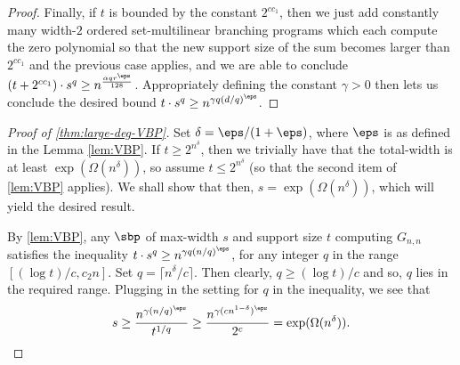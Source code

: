 \documentclass{article}
\begin{document}
\begin{proof}
Finally, if $t$ is bounded by the constant $2^{cc_1}$, then we just add constantly many width-$2$ ordered set-multilinear branching programs which each compute the zero polynomial so that the new support size of the sum becomes larger than $2^{cc_1}$ and the previous case applies, and we are able to conclude $(t + 2^{cc_1})\cdot s^q \geq n^{{\frac{\alpha qr^\eps }{128}}}$. Appropriately defining the constant $\gamma>0$ then lets  us conclude the desired bound $t\cdot s^q \geq n^{{{\gamma q(d/q)^\eps}}}$.
\end{proof}

\begin{proof}[Proof of \autoref{thm:large-deg-VBP}]
Set $\delta = \eps/(1+\eps)$, where $\eps$ is as defined in the Lemma \ref{lem:VBP}. If $t \geq 2^{n^{\delta}}$, then we trivially have that the total-width is at least  ${\exp(\Omega(n^{\delta}))}$, so assume $t \leq 2^{n^{\delta}}$ (so that the second item of \autoref{lem:VBP} applies). We shall show that then, $s = \exp(\Omega(n^{\delta}))$, which will yield the desired result.

By \autoref{lem:VBP}, any $\sbp$ of max-width $s$ and support size $t$ computing $G_{n,n}$ satisfies the inequality $t\cdot s^q \geq n^{{\gamma q(n/q)^\eps}}$, for any integer $q$ in the range $ [(\log t)/c, c_2n]$. Set $q = \lceil n^{\delta}/c\rceil$. Then clearly, $q\geq (\log t)/c$ and so, $q$ lies in the required range.  Plugging in the setting for $q$ in the inequality, we see that 
\[
s \geq \frac{n^{\gamma{({n/q})^\eps}}}{t^{1/q}} \geq \frac{n^{\gamma({cn^{1-\delta}})^{\eps}}}{2^c} = \exp(\Omega(n^{\delta})).
\]
\end{proof}
\end{document}
